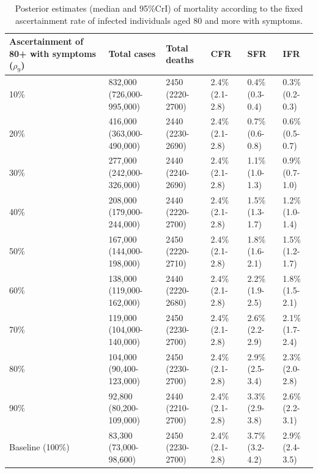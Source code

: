 \documentclass{article}
\begin{document}
	\begin{table}[H]
		\centering
		\caption{Posterior estimates (median and 95\%CrI) of mortality according to the fixed ascertainment rate of infected individuals aged 80 and more with symptoms.}
		\begin{tabular}{p{2.5cm}lllll}
			\hline
			Ascertainment of 80+ with symptoms ($\rho_9$) & Total cases & Total deaths & CFR & SFR & IFR \\ 
			\hline
			10\% & 832,000 (726,000-995,000) & 2450 (2220-2700) & 2.4\% (2.1-2.8) & 0.4\% (0.3-0.4) & 0.3\% (0.2-0.3) \\ 
			20\% & 416,000 (363,000-490,000) & 2440 (2230-2690) & 2.4\% (2.1-2.8) & 0.7\% (0.6-0.8) & 0.6\% (0.5-0.7) \\ 
			30\% & 277,000 (242,000-326,000) & 2440 (2240-2690) & 2.4\% (2.1-2.8) & 1.1\% (1.0-1.3) & 0.9\% (0.7-1.0) \\ 
			40\% & 208,000 (179,000-244,000) & 2440 (2220-2700) & 2.4\% (2.1-2.8) & 1.5\% (1.3-1.7) & 1.2\% (1.0-1.4) \\ 
			50\% & 167,000 (144,000-198,000) & 2450 (2220-2710) & 2.4\% (2.1-2.8) & 1.8\% (1.6-2.1) & 1.5\% (1.2-1.7) \\ 
			60\% & 138,000 (119,000-162,000) & 2440 (2220-2680) & 2.4\% (2.1-2.8) & 2.2\% (1.9-2.5) & 1.8\% (1.5-2.1) \\ 
			70\% & 119,000 (104,000-140,000) & 2450 (2230-2700) & 2.4\% (2.1-2.8) & 2.6\% (2.2-2.9) & 2.1\% (1.7-2.4) \\ 
			80\% & 104,000 (90,400-123,000) & 2450 (2230-2700) & 2.4\% (2.1-2.8) & 2.9\% (2.5-3.4) & 2.3\% (2.0-2.8) \\ 
			90\% & 92,800 (80,200-109,000) & 2440 (2210-2700) & 2.4\% (2.1-2.8) & 3.3\% (2.9-3.8) & 2.6\% (2.2-3.1) \\ 
	Baseline (100\%) & 83,300 (73,000-98,600) & 2450 (2230-2700) & 2.4\% (2.1-2.8) & 3.7\% (3.2-4.2) & 2.9\% (2.4-3.5) \\ 
				\hline
		\end{tabular}
	\end{table}

	
\end{document}
